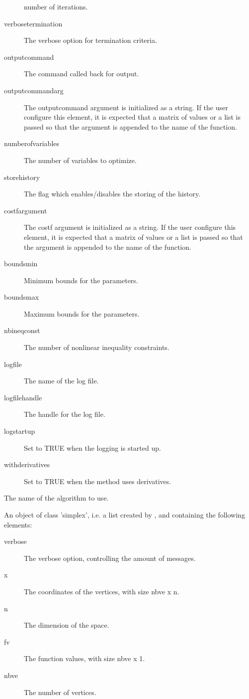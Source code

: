 \begin{Arguments}
\begin{ldescription}
\begin{description}
number of iterations.
\item[verbosetermination] The verbose option for termination criteria.
\item[outputcommand] The command called back for output.
\item[outputcommandarg] The outputcommand argument is initialized as a
string. If the user configure this element, it is expected that a matrix
of values or a list is passed so that the argument is appended to the
name of the function.
\item[numberofvariables] The number of variables to optimize.
\item[storehistory] The flag which enables/disables the storing of the
history.
\item[costfargument] The costf argument is initialized as a string. If
the user configure this element, it is expected that a matrix of values
or a list is passed so that the argument is appended to the name of the
function.
\item[boundsmin] Minimum bounds for the parameters.
\item[boundsmax] Maximum bounds for the parameters.
\item[nbineqconst] The number of nonlinear inequality constraints.
\item[logfile] The name of the log file.
\item[logfilehandle] The handle for the log file.
\item[logstartup] Set to TRUE when the logging is started up.
\item[withderivatives] Set to TRUE when the method uses derivatives.

\end{description}


\item[\code{method}] The name of the algorithm to use.
\item[\code{simplex0}] An object of class 'simplex', i.e. a list created by
, and containing the following elements:\begin{description}

\item[verbose] The verbose option, controlling the amount of messages.
\item[x] The coordinates of the vertices, with size nbve x n.
\item[n] The dimension of the space.
\item[fv] The function values, with size nbve x 1.
\item[nbve] The number of vertices.


\end{description}
\end{ldescription}
\end{Arguments}

